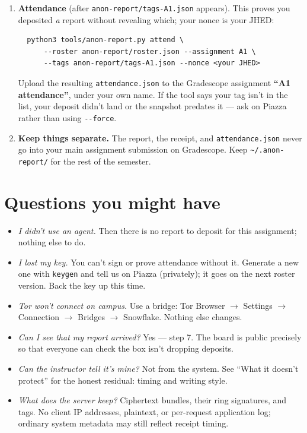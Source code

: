 \documentclass[11pt]{article}
\newcommand{\code}[1]{\texttt{#1}}
\newcommand{\file}[1]{\texttt{#1}}
\begin{document}
\begin{enumerate}
\begin{verbatim}
  python3 tools/anon-report.py verify-bundle \
      anon-report/bulletin/A1/<your tag>.json \
      --roster anon-report/roster.json
\end{verbatim}
\item \textbf{Attendance} (after \file{anon-report/tags-A1.json} appears). This proves
  you deposited \emph{a} report without revealing which; your nonce is your JHED:
\begin{verbatim}
  python3 tools/anon-report.py attend \
      --roster anon-report/roster.json --assignment A1 \
      --tags anon-report/tags-A1.json --nonce <your JHED>
\end{verbatim}
  Upload the resulting \file{attendance.json} to the Gradescope assignment
  \textbf{``A1 attendance''}, under your own name. If the tool says your tag isn't in
  the list, your deposit didn't land or the snapshot predates it --- ask on Piazza
  rather than using \code{-{}-force}.
\item \textbf{Keep things separate.} The report, the receipt, and
  \file{attendance.json} never go into your main assignment submission on Gradescope.
  Keep \file{\textasciitilde/.anon-report/} for the rest of the semester.
\end{enumerate}

\section*{Questions you might have}

\begin{itemize}
\item \emph{I didn't use an agent.} Then there is no report to deposit for this
  assignment; nothing else to do.
\item \emph{I lost my key.} You can't sign or prove attendance without it. Generate a
  new one with \code{keygen} and tell us on Piazza (privately); it goes on the next
  roster version. Back the key up this time.
\item \emph{Tor won't connect on campus.} Use a bridge: Tor Browser $\to$ Settings
  $\to$ Connection $\to$ Bridges $\to$ Snowflake. Nothing else changes.
\item \emph{Can I see that my report arrived?} Yes --- step 7. The board is public
  precisely so that everyone can check the box isn't dropping deposits.
\item \emph{Can the instructor tell it's mine?} Not from the system. See ``What it
  doesn't protect'' for the honest residual: timing and writing style.
\item \emph{What does the server keep?} Ciphertext bundles, their ring signatures, and
  tags. No client IP addresses, plaintext, or per-request application log; ordinary
  system metadata may still reflect receipt timing.
\end{itemize}
\end{document}
